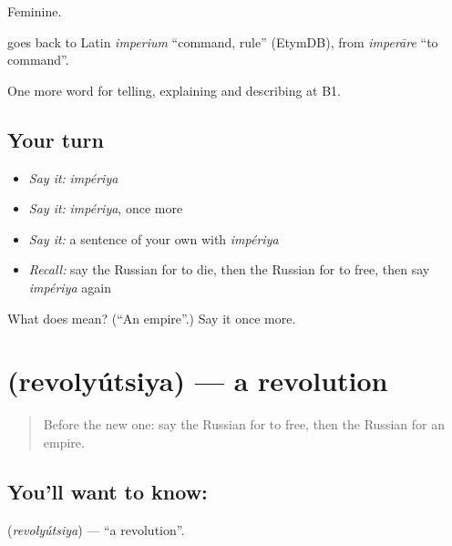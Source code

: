 Feminine.

\begin{cousinweb}
\emph{} goes back to Latin \emph{imperium} \textquotedblleft{}command, rule\textquotedblright{} (EtymDB), from \emph{imperāre} \textquotedblleft{}to command\textquotedblright{}.
\end{cousinweb}

\begin{grammarlens}[title={What you've built}]
One more word for telling, explaining and describing at B1.
\end{grammarlens}

\subsection*{Your turn}
\begin{itemize}
\raggedright
  \item \emph{Say it:} \emph{impériya}
  \item \emph{Say it:} \emph{impériya}, once more
  \item \emph{Say it:} a sentence of your own with \emph{impériya}
  \item \emph{Recall:} say the Russian for to die, then the Russian for to free, then say \emph{impériya} again
\end{itemize}

\begin{tcolorbox}[breakable,colback=teal!4,colframe=teal!35!black,title={Before you move on}]
What does  mean? (\textquotedblleft{}An empire\textquotedblright{}.) Say it once more.
\end{tcolorbox}
\section[\texorpdfstring{\ru{революция} (revolyútsiya)}{революция (revolyútsiya)}]{ (revolyútsiya) — a revolution}

\label{lesson:RU-C325-revolyutsiya}



\begin{quote}
Before the new one: say the Russian for to free, then the Russian for an empire.
\end{quote}

\subsection*{You'll want to know: }
\textbf{} (\emph{revolyútsiya}) — \textquotedblleft{}a revolution\textquotedblright{}.

